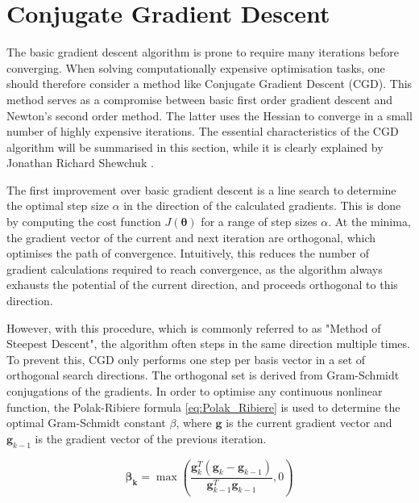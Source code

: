 

\section{Conjugate Gradient Descent}
\noindent
The basic gradient descent algorithm is prone to require many iterations before converging.
When solving computationally expensive optimisation tasks,
one should therefore consider a method like Conjugate Gradient Descent (CGD).
This method serves as a compromise between basic first order gradient descent and Newton's second order method.
The latter uses the Hessian to converge in a small number of highly expensive iterations.
The essential characteristics of the CGD algorithm will be summarised in this section, while it is clearly explained by Jonathan Richard Shewchuk \cite{shewchuk1994introduction}.

The first improvement over basic gradient descent is a line search to determine the optimal step size $\alpha$ in the direction of the calculated gradients.
This is done by computing the cost function $J(\bm{\theta})$ for a range of step sizes $\alpha$.
At the minima, the gradient vector of the current and next iteration are orthogonal, which optimises the path of convergence.  %
Intuitively, this reduces the number of gradient calculations required to reach convergence, as the algorithm always exhausts the potential of the current direction, and proceeds orthogonal to this direction.

However, with this procedure, which is commonly referred to as "Method of Steepest Descent", the algorithm often steps in the same direction multiple times.
To prevent this, CGD only performs one step per basis vector in a set of orthogonal search directions.
The orthogonal set is derived from Gram-Schmidt conjugations of the gradients.
In order to optimise any continuous nonlinear function, the Polak-Ribiere formula \eqref{eq:Polak_Ribiere} is used to determine the optimal Gram-Schmidt constant $\beta$,
where $\bm{g}$ is the current gradient vector and $\bm{g}_{k-1}$ is the gradient vector of the previous iteration.

\begin{equation}\label{eq:Polak_Ribiere}
    \bm{\beta_{k}} = \max{ \left( \frac{\bm{g}^T_{k}(\bm{g}_{k} - \bm{g}_{k-1})}{\bm{g}^T_{k-1} \bm{g}_{k-1}}, 0 \right) }
\end{equation}

